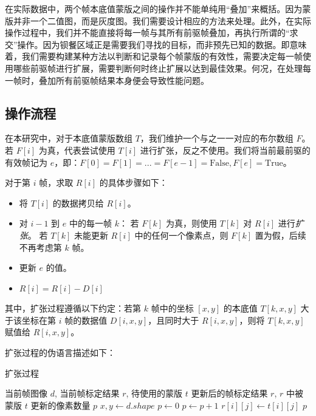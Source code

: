 在实际数据中，两个帧本底值蒙版之间的操作并不能单纯用“叠加”来概括。因为蒙版并非一个二值图，而是灰度图。我们需要设计相应的方法来处理。此外，在实际操作过程中，我们并不能直接将每一帧与其所有前驱帧叠加，再执行所谓的“求交”操作。因为钡餐区域正是需要我们寻找的目标，而非预先已知的数据。即意味着，我们需要构建某种方法以判断和记录每个帧蒙版的有效性，需要决定每一帧使用哪些前驱帧进行扩展，需要判断何时终止扩展以达到最佳效果。何况，在处理每一帧时，叠加所有前驱帧结果本身便会导致性能问题。

\subsection{操作流程}

在本研究中，对于本底值蒙版数组 $T$，我们维护一个与之一一对应的布尔数组 $F$。若 $F[i]$ 为真，代表尝试使用 $T[i]$ 进行扩张，反之不使用。我们将当前最前驱的有效帧记为 $e$，即：$F[0]=F[1]=...=F[e-1]=\text{False}, F[e]=\text{True}$。

对于第 $i$ 帧，求取 $R[i]$ 的具体步骤如下：
\begin{itemize}
    \item 将 $T[i]$ 的数据拷贝给 $R[i]$。
    \item 对 $i-1$ 到 $e$ 中的每一帧 $k$：
    \subitem 若 $F[k]$ 为真，则使用 $T[k]$ 对 $R[i]$ 进行\textit{扩张}。
    \subitem 若 $T[k]$ 未能更新 $R[i]$ 中的任何一个像素点，则 $F[k]$ 置为假，后续不再考虑第 $k$ 帧。
    \item 更新 $e$ 的值。
    \item $R[i] = R[i] - D[i]$
\end{itemize}

其中，扩张过程遵循以下约定：若第 $k$ 帧中的坐标 $[x, y]$ 的本底值 $T[k, x, y]$ 大于该坐标在第 $i$ 帧的数据值 $D[i, x, y]$，且同时大于 $R[i, x, y]$，则将 $T[k, x, y]$ 赋值给 $R[i, x, y]$。

扩张过程的伪语言描述如下：
\begin{algorithm}
    \caption{扩张过程}\label{algo:expansion}
    \begin{algorithmic}[1]
        \Require 当前帧图像 $d$, 当前帧标定结果 $r$, 待使用的蒙版 $t$
        \Ensure 更新后的帧标定结果 $r$, $r$ 中被蒙版 $t$ 更新的像素数量 $p$
            \State $x, y \gets d.shape$ %
            \State $p \gets 0$ %
                            \State $p \gets p + 1$ %
                            \State $r[i][j] \gets t[i][j]$ %
                        \EndIf
                    \EndIf
                \EndFor
            \EndFor
            \State \Return $p$ %
        \EndFunction
    \end{algorithmic}
\end{algorithm}

